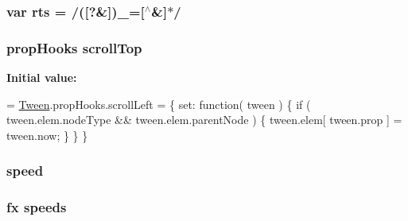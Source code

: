 \hypertarget{jquery-1_89_81_8js_a38ff30904f54277281a13514d7aea00d}{
\subsubsection[{rts}]{\setlength{\rightskip}{0pt plus 5cm}var rts = /(\mbox{[}?\&\mbox{]}){\bf \+\_\+}=\mbox{[}$^\wedge$\&\mbox{]}$\ast$/}}\label{jquery-1_89_81_8js_a38ff30904f54277281a13514d7aea00d}
\hypertarget{jquery-1_89_81_8js_a57beb1f611d6c8b84919b0f7d9e0e890}{
\subsubsection[{scroll\+Top}]{ {\bf prop\+Hooks} scroll\+Top}}\label{jquery-1_89_81_8js_a57beb1f611d6c8b84919b0f7d9e0e890}
{\bfseries Initial value\+:}
\begin{DoxyCode}
= \hyperlink{jquery-1_89_81_8js_a91e55267cc469e865a6a7c6cfc51c7b1}{Tween}.propHooks.scrollLeft = \{
    set: \textcolor{keyword}{function}( tween ) \{
        \textcolor{keywordflow}{if} ( tween.elem.nodeType && tween.elem.parentNode ) \{
            tween.elem[ tween.prop ] = tween.now;
        \}
    \}
\}
\end{DoxyCode}
\hypertarget{jquery-1_89_81_8js_add98c90065e6563cba26ff6d2016c46c}{
\subsubsection[{speed}]{ speed}}\label{jquery-1_89_81_8js_add98c90065e6563cba26ff6d2016c46c}
\hypertarget{jquery-1_89_81_8js_a1079544ab08b6d4ca1692ce090f6ea2d}{
\subsubsection[{speeds}]{ {\bf fx} speeds}}\label{jquery-1_89_81_8js_a1079544ab08b6d4ca1692ce090f6ea2d}
